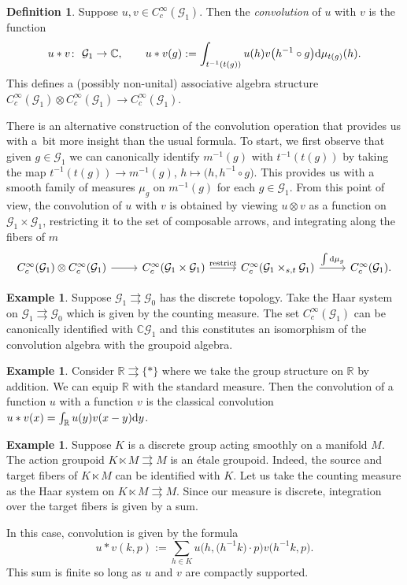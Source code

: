 \documentclass[10pt,a4paper]{amsart}
\numberwithin{equation}{section}
\theoremstyle{definition}
\newtheorem{Definition}[Theorem]{Definition}
\newtheorem{Example}[Theorem]{Example}
\newcommand{\BBR}{\mathbb{R}}
\newcommand{\BBC}{\mathbb{C}}
\newcommand{\CG}{\mathcal{G}}
\newcommand{\inv}{^{-1}}
\newcommand{\grpd}{\rightrightarrows}
\begin{document}
\begin{Definition}
  Suppose $ u, v \in C_c^\infty(\CG_1) $. Then the \emph{convolution} of $ u $ with $ v $ is the function
  \[
  u * v \colon\ \CG_1 \to \BBC, \qquad u*v(g) := \int_{t\inv(t(g))} u(h) v\big(h\inv \circ g\big) {\rm d} \mu_{t(g)}(h).
  \]
  This defines a (possibly non-unital) associative algebra structure
  $C_c^\infty(\CG_1 ) \otimes C_c^\infty(\CG_1) \to C_c^\infty(\CG_1)$.
\end{Definition}
There is an alternative construction of the convolution operation that provides us with a~bit more insight than the usual formula. To start, we first observe that given $ g \in \CG_1 $ we can canonically identify $ m\inv(g)$ with $ t\inv(t(g)) $ by taking the map
$t\inv(t(g)) \to m\inv(g)$, ${h \mapsto \big(h, h\inv \circ g \big)}$.
This provides us with a smooth family of measures $ \mu_g $ on $ m\inv(g) $ for each $ g \in \CG_1 $. From this point of view, the convolution of $ u $ with $ v $ is obtained by viewing $ u \otimes v $ as a function on $ \CG_1 \times \CG_1 $, restricting it to the set of composable arrows, and integrating along the fibers of $ m $
\[\begin{tikzcd}
C_c^\infty(\CG_1 ) \otimes C_c^\infty(\CG_1) \arrow[r]& C_c^\infty(\CG_1 \times \CG_1) \arrow[r, "\text{restrict}"] & C_c^\infty( \CG_1 \times_{s,t} \CG_1) \arrow[r, "{\int {\rm d} \mu_g}"] & C_c^\infty(\CG_1).
\end{tikzcd}
\]
\begin{Example}\label{example:category.algebra.convolution}
   Suppose $ \CG_1 \grpd \CG_0 $ has the discrete topology. Take the Haar system on $ \CG_1 \grpd \CG_0 $ which is given by the counting measure. The set $ C_c^\infty(\CG_1)$ can be canonically identified with $ \BBC \CG_1 $ and this constitutes an isomorphism of the convolution algebra with the groupoid algebra.
\end{Example}
\begin{Example}
   Consider $ \BBR \grpd \{ * \} $ where we take the group structure on $ \BBR $ by addition. We can equip $ \BBR $ with the standard measure. Then the convolution of a function $ u $ with a function $ v $ is the classical convolution
  $u * v (x) = \int_{\BBR} u(y) v(x-y) {\rm d}y $.
\end{Example}

\begin{Example}
   Suppose $ K $ is a discrete group acting smoothly on a manifold $ M $. The action groupoid $ K \ltimes M \grpd M $ is an \'etale groupoid. Indeed, the source and target fibers of $ K \ltimes M $ can be identified with $ K $. Let us take the counting measure as the Haar system on $ K \ltimes M \grpd M $. Since our measure is discrete, integration over the target fibers is given by a sum.

  In this case, convolution is given by the formula
  \[ u * v (k,p) := \sum_{h \in K } u\big(h, \big(h\inv k\big) \cdot p \big) v\big(h\inv k, p\big).
   \]
  This sum is finite so long as $ u $ and $ v $ are compactly supported.
\end{Example}
\end{document}
